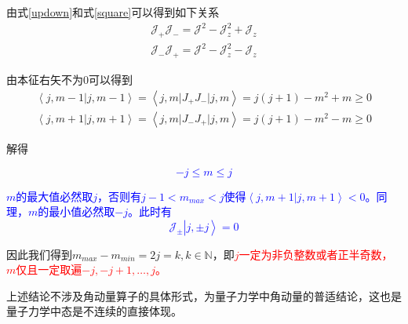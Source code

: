 \documentclass[UTF8,12pt]{article}
\providecommand\Ket[1]{\left|\right. #1 \left.\right\rangle}
\providecommand\Bracket[2]{\left\langle #1 \big| #2 \right\rangle}
\providecommand\BraCket[3]{\left\langle #1 \big| #2 \big| #3 \right\rangle}
\numberwithin{equation}{subsection}
\providecommand{\empB}[1]{\textcolor{blue}{#1}}
\providecommand{\empR}[1]{\textcolor{red}{#1}}
\begin{document}
	由式\ref{updown}和式\ref{square}可以得到如下关系\begin{subequations}
		\nonumber
		\begin{align}
			\mathcal J_+\mathcal J_-=\mathcal J^2-\mathcal J^2_z+\mathcal J_z\\
			\mathcal J_-\mathcal J_+=\mathcal J^2-\mathcal J^2_z-\mathcal J_z
		\end{align}
	\end{subequations}

	由本征右矢不为$0$可以得到
		\begin{subequations}
			\nonumber
			\begin{align}
				\Bracket{j,m-1}{j,m-1}=\BraCket{j,m}{J_+J_-}{j,m}=j(j+1)-m^2+m\geq0\\
				\Bracket{j,m+1}{j,m+1}=\BraCket{j,m}{J_-J_+}{j,m}=j(j+1)-m^2-m\geq0
			\end{align}
		\end{subequations}
	
	解得
	\begin{snugshade}
		\empB{\begin{equation}
				-j\leq m\leq j
				\label{fond}
		\end{equation}}
	\end{snugshade}
	
	\empB{$m$的最大值必然取$j$，否则有$j-1<m_{max}<j$使得$\Bracket{j,m+1}{j,m+1}<0$。同理，$m$的最小值必然取$-j$。此时有$$\mathcal J_\pm\Ket{j,\pm j}=0$$}
	
	因此我们得到$m_{max}-m_{min} = 2j = k,k\in \mathbb{N}$，即\empR{$j$一定为非负整数或者正半奇数，$m$仅且一定取遍$-j,-j+1,\dots,j$。}
	
	上述结论不涉及角动量算子的具体形式，为量子力学中角动量的普适结论，这也是量子力学中态是不连续的直接体现。
\end{document}
